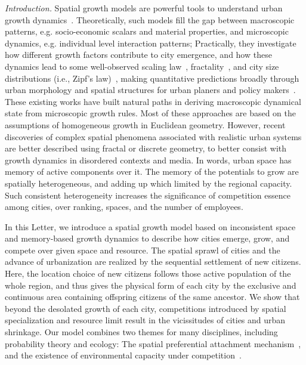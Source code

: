 \documentclass[reprint,unsortedaddress,amsmath,amssymb,aps,prl,showkeys]{revtex4-2}
\begin{document}
\textit{Introduction.} Spatial growth models are powerful tools to understand urban growth dynamics~\cite{PhysRevX.4.011008, Li2017Simple, makse1995modelling, rybski2013distance, nanda2017spatial}. Theoretically, such models fill the gap between macroscopic patterns, e.g. socio-economic scalars and material properties, and microscopic dynamics, e.g. individual level interaction patterns; Practically, they investigate how different growth factors contribute to city emergence, and how these dynamics lead to some well-observed scaling law~\cite{bettencourt2007growth,court2013origins,batty2008size,batty2019urbanscalinglaw}, fractality~\cite{batty1994fractal,batty2007cities}, and city size distributions (i.e., Zipf's law)~\cite{zipf1949human}, making quantitative predictions broadly through urban morphology and spatial structures for urban planers and policy makers~\cite{anas1998urban}. These existing works have built natural paths in deriving macroscopic dynamical state from microscopic growth rules. Most of these approaches are based on the assumptions of homogeneous growth in Euclidean geometry. However, recent discoveries of complex spatial phenomena associated with realistic urban systems are better described using fractal or discrete geometry\cite{makse1995modelling,louf2014congestion,PhysRevE.58.7054}, to better consist with growth dynamics in disordered contexts and media. In words, urban space has memory of active components over it. The memory of the potentials to grow are spatially heterogeneous, and adding up which limited by the regional capacity. Such consistent heterogeneity increases the significance of competition essence among cities, over ranking, spaces, and the number of employees. 

In this Letter, we introduce a spatial growth model based on inconsistent space and memory-based growth dynamics to describe how cities emerge, grow, and compete over given space and resource. The spatial sprawl of cities and the advance of urbanization are realized by the sequential settlement of new citizens. Here, the location choice of new citizens follows those active population of the whole region, and thus gives the physical form of each city by the exclusive and continuous area containing offspring citizens of the same ancestor. We show that beyond the desolated growth of each city, competitions introduced by spatial specialization and resource limit result in the vicissitudes of cities and urban shrinkage. Our model combines two themes for many disciplines, including probability theory and ecology: The spatial preferential attachment mechanism~\cite{Li2017Simple}, and the existence of environmental capacity under competition~\cite{gude2020bacterial,liu2019an}. 
\end{document}
